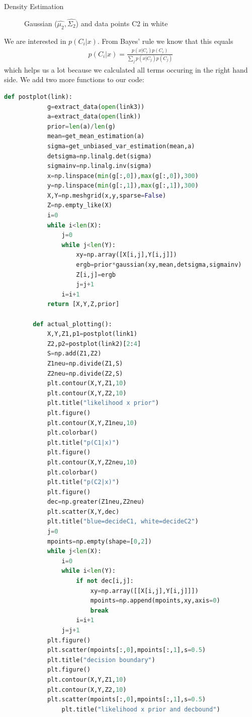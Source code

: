 \documentclass[
ngerman,
]{tudaexercise}
\begin{document}
\begin{task}{Density Estimation}
\begin{subtask}
\begin{figure}[H]
	\caption{Gaussian ($\hat{\mu_2},\hat{\Sigma_2}$) and data points C2 in white}
\end{figure}
\end{subtask}\noindent
\begin{subtask}
	We are interested in $p(C_i|x)$. From Bayes' rule we know that this equals\begin{align*}
		p(C_i|x)=\frac{p(x|C_i)p(C_i)}{\sum_j p(x|C_j)p(C_j)}
	\end{align*}
	which helps us a lot because we calculated all terms occuring in the right hand side. We add two more functions to our code:
	\begin{lstlisting}[language=Python]
		def postplot(link):
			g=extract_data(open(link3))
			a=extract_data(open(link))
			prior=len(a)/len(g)
			mean=get_mean_estimation(a)
			sigma=get_unbiased_var_estimation(mean,a)
			detsigma=np.linalg.det(sigma)
			sigmainv=np.linalg.inv(sigma)
			x=np.linspace(min(g[:,0]),max(g[:,0]),300)
			y=np.linspace(min(g[:,1]),max(g[:,1]),300)
			X,Y=np.meshgrid(x,y,sparse=False)
			Z=np.empty_like(X)
			i=0
			while i<len(X):
				j=0
				while j<len(Y):
					xy=np.array([X[i,j],Y[i,j]])
					ergb=prior*gaussian(xy,mean,detsigma,sigmainv)
					Z[i,j]=ergb
					j=j+1
				i=i+1
			return [X,Y,Z,prior]
		
		def actual_plotting():
			X,Y,Z1,p1=postplot(link1)
			Z2,p2=postplot(link2)[2:4]
			S=np.add(Z1,Z2)
			Z1neu=np.divide(Z1,S)
			Z2neu=np.divide(Z2,S)
			plt.contour(X,Y,Z1,10)
			plt.contour(X,Y,Z2,10)
			plt.title("likelihood x prior")
			plt.figure()
			plt.contour(X,Y,Z1neu,10)
			plt.colorbar()
			plt.title("p(C1|x)")
			plt.figure()
			plt.contour(X,Y,Z2neu,10)
			plt.colorbar()
			plt.title("p(C2|x)")
			plt.figure()
			dec=np.greater(Z1neu,Z2neu)
			plt.scatter(X,Y,dec)
			plt.title("blue=decideC1, white=decideC2") 
			j=0
			mpoints=np.empty(shape=[0,2])
			while j<len(X):
				i=0
				while i<len(Y):
					if not dec[i,j]:
						xy=np.array([[X[i,j],Y[i,j]]])
						mpoints=np.append(mpoints,xy,axis=0)
						break
					i=i+1
				j=j+1
			plt.figure()
			plt.scatter(mpoints[:,0],mpoints[:,1],s=0.5)
			plt.title("decision boundary") 
			plt.figure()
			plt.contour(X,Y,Z1,10)
			plt.contour(X,Y,Z2,10)
			plt.scatter(mpoints[:,0],mpoints[:,1],s=0.5)
    			plt.title("likelihood x prior and decbound")


\end{lstlisting}
\end{subtask}
\end{task}
\end{document}
